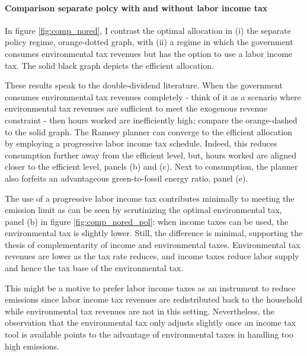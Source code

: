 \begin{figure}[h!!]
\begin{minipage}[]{0.32\textwidth}
	\end{minipage}
\end{figure}


\paragraph{Comparison separate polcy with and without labor income tax}


In figure \ref{fig:comp_nored}, I contrast the optimal allocation in (i) the separate policy regime, orange-dotted graph, with (ii) a regime in which the government consumes environmental tax revenues but has the option to use a labor income tax. The solid black graph depicts the efficient allocation. 

These results speak to the double-dividend literature. When the government consumes environmental tax revenues completely - think of it as a scenario where environmental tax revenues are sufficient to meet the exogenous revenue constraint - then hours worked are inefficiently high; compare the orange-dashed to  the solid graph. The Ramsey planner can converge to the efficient allocation by employing a progressive labor income tax schedule. Indeed, this reduces consumption further away from the efficient level, but, hours worked are aligned closer to the efficient level, panels (b) and (c). Next to consumption, the planner also forfeits an advantageous green-to-fossil energy ratio, panel (e). 

The use of a progressive labor income tax contributes minimally to meeting the emission limit as can be seen by scrutinizing the optimal environmental tax, panel (b) in figure \ref{fig:comp_nored_pol}: when income taxes can be used, the environmental tax is slightly lower. Still, the difference is minimal, supporting the thesis of complementarity of income and environmental taxes. 
Environmental tax revenues are lower as the tax rate reduces, and income taxes reduce labor supply and hence the tax base of the environmental tax. 

This might be a motive to prefer labor income taxes as an instrument to reduce emissions since labor income tax revenues are redistributed back to the household while environmental tax revenues are not in this setting. Nevertheless, the observation that the environmental tax only adjusts slightly once an income tax tool is available points to the advantage of environmental taxes in handling too high emissions. 



